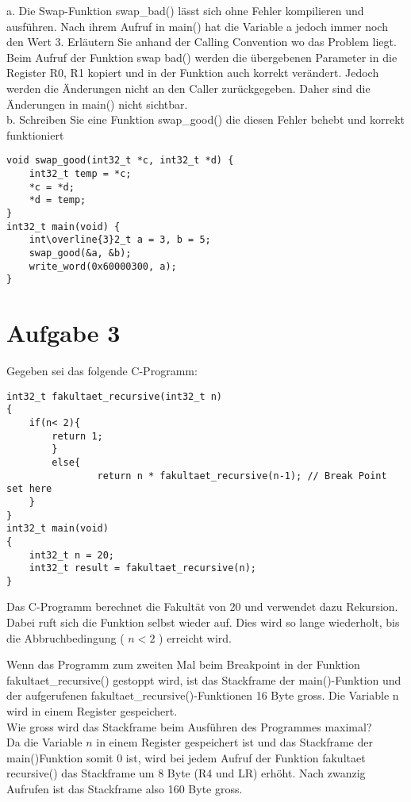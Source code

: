 \documentclass[10pt]{article}
\begin{document}
a. Die Swap-Funktion swap\_bad() lässt sich ohne Fehler kompilieren und ausführen. Nach ihrem Aufruf in main() hat die Variable a jedoch immer noch den Wert 3. Erläutern Sie anhand der Calling Convention wo das Problem liegt.\\
Beim Aufruf der Funktion swap bad() werden die übergebenen Parameter in die Register R0, R1 kopiert und in der Funktion auch korrekt verändert. Jedoch werden die Änderungen nicht an den Caller zurückgegeben. Daher sind die Änderungen in main() nicht sichtbar.\\
b. Schreiben Sie eine Funktion swap\_good() die diesen Fehler behebt und korrekt funktioniert

\begin{verbatim}
void swap_good(int32_t *c, int32_t *d) {
    int32_t temp = *c;
    *c = *d;
    *d = temp;
}
int32_t main(void) {
    int\overline{3}2_t a = 3, b = 5;
    swap_good(&a, &b);
    write_word(0x60000300, a);
}
\end{verbatim}

\section*{Aufgabe 3}
Gegeben sei das folgende C-Programm:

\begin{verbatim}
int32_t fakultaet_recursive(int32_t n)
{
    if(n< 2){
        return 1;
        }
        else{
                return n * fakultaet_recursive(n-1); // Break Point set here
    }
}
int32_t main(void)
{
    int32_t n = 20;
    int32_t result = fakultaet_recursive(n);
}
\end{verbatim}

Das C-Programm berechnet die Fakultät von 20 und verwendet dazu Rekursion. Dabei ruft sich die Funktion selbst wieder auf. Dies wird so lange wiederholt, bis die Abbruchbedingung ( $n<2$ ) erreicht wird.

Wenn das Programm zum zweiten Mal beim Breakpoint in der Funktion fakultaet\_recursive() gestoppt wird, ist das Stackframe der main()-Funktion und der aufgerufenen fakultaet\_recursive()-Funktionen 16 Byte gross. Die Variable n wird in einem Register gespeichert.\\
Wie gross wird das Stackframe beim Ausführen des Programmes maximal?\\
Da die Variable $n$ in einem Register gespeichert ist und das Stackframe der main()Funktion somit 0 ist, wird bei jedem Aufruf der Funktion fakultaet recursive() das Stackframe um 8 Byte (R4 und LR) erhöht. Nach zwanzig Aufrufen ist das Stackframe also 160 Byte gross.
\end{document}
